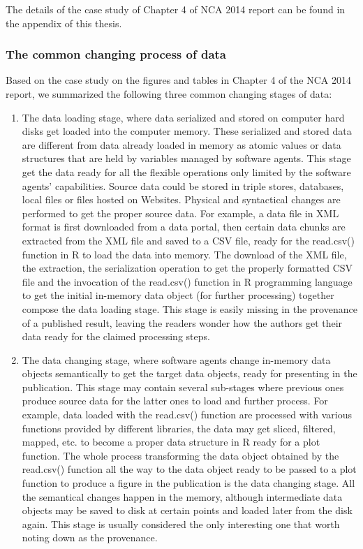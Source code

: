 The details of the case study of Chapter 4 of NCA 2014 report can be found in the appendix of this thesis.

\subsubsection{The common changing process of data}
Based on the case study on the figures and tables in Chapter 4 of the NCA 2014 report, we summarized the following three common changing stages of data:
\begin{enumerate}
	\item The data loading stage, where data serialized and stored on computer hard disks get loaded into the computer memory. These serialized and stored data are different from data already loaded in memory as atomic values or data structures that are held by variables managed by software agents. This stage get the data ready for all the flexible operations only limited by the software agents' capabilities. Source data could be stored in triple stores, databases, local files or files hosted on Websites. Physical and syntactical changes are performed to get the proper source data. For example, a data file in XML format is first downloaded from a data portal, then certain data chunks are extracted from the XML file and saved to a CSV file, ready for the read.csv() function in R to load the data into memory. The download of the XML file, the extraction, the serialization operation to get the properly formatted CSV file and the invocation of the read.csv() function in R programming language to get the initial in-memory data object (for further processing) together compose the data loading stage. This stage is easily missing in the provenance of a published result, leaving the readers wonder how the authors get their data ready for the claimed processing steps.
	\item The data changing stage, where software agents change in-memory data objects semantically to get the target data objects, ready for presenting in the publication. This stage may contain several sub-stages where previous ones produce source data for the latter ones to load and further process. For example, data loaded with the read.csv() function are processed with various functions provided by different libraries, the data may get sliced, filtered, mapped, etc. to become a proper data structure in R ready for a plot function. The whole process transforming the data object obtained by the read.csv() function all the way to the data object ready to be passed to a plot function to produce a figure in the publication is the data changing stage. All the semantical changes happen in the memory, although intermediate data objects may be saved to disk at certain points and loaded later from the disk again. This stage is usually considered the only interesting one that worth noting down as the provenance.

\end{enumerate}
